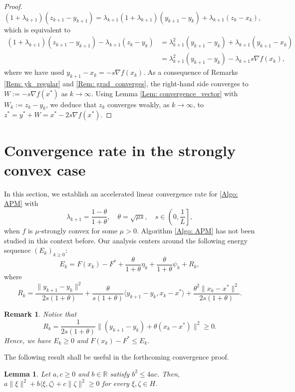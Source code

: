 \documentclass[pdflatex,sn-mathphys-num]{sn-jnl}
\theoremstyle{thmstyleone}
\newtheorem{lemma}[theorem]{Lemma}
\theoremstyle{thmstyletwo}
\newtheorem{remark}{Remark}
\theoremstyle{thmstylethree}
\begin{document}
\begin{proof}
$$ (1+\lambda_{k+1})(z_{k+1}-y_{k+1}) = \lambda_{k+1}(1+\lambda_{k+1})(y_{k+1}-y_k) + \lambda_{k+1}(z_k-x_k),  $$
which is equivalent to
\begin{align*}
(1+\lambda_{k+1})(z_{k+1}-y_{k+1})-\lambda_{k+1}(z_k-y_k) 
& = \lambda_{k+1}^2(y_{k+1}-y_k)+\lambda_{k+1}(y_{k+1}-x_k) \\
& = \lambda_{k+1}^2(y_{k+1}-y_k)-\lambda_{k+1}s\nabla f(x_k),
\end{align*}
where we have used $y_{k+1}-x_k=-s\nabla f(x_k)$. As a consequence of Remarks \ref{Rem: yk_regular} and \ref{Rem: grad_converges}, the right-hand side converges to $W:=-s\nabla f(x^*)$ as $k\to\infty$. Using Lemma \ref{Lem: convergence_vector} with $W_k:=z_k-y_k$, we deduce that $z_k$ converges weakly, as $k\to\infty$, to $z^*=y^*+W=x^*-2s\nabla f(x^*)$.
\end{proof}




\section{Convergence rate in the strongly convex case}\label{Sec: strong convexity}
In this section, we establish an accelerated linear convergence rate for \eqref{Algo: APM} with
$$ \lambda_{k+1} = \frac{1-\theta}{1+\theta},\quad \theta=\sqrt{\mu s},\quad s\in\left( 0,\frac{1}{L} \right], $$
when $f$ is $\mu$-strongly convex for some $\mu>0$. Algorithm \eqref{Algo: APM} has not been studied in this context before. Our analysis centers around the following energy sequence $(E_k)_{k\ge 0}$:
\begin{equation}\label{E: E_k_SC}
E_k = F(x_k) - F^* + \frac{\theta}{1+\theta}\eta_k + \frac{\theta}{1+\theta}\psi_k + R_k,
\end{equation}
where
$$ R_k = \frac{\| y_{k+1} - y_k \|^2}{2s(1+\theta)} + \frac{\theta}{s(1+\theta)}\langle y_{k+1}-y_k, x_k-x^* \rangle + \frac{\theta^2 \| x_k - x^* \|^2 }{2s(1+\theta)}. $$


\begin{remark}
Notice that
$$R_k = \frac{1}{2s(1+\theta)}\| (y_{k+1}-y_k) + \theta(x_k-x^*) \|^2 \ge 0.$$
Hence, we have $E_k \ge 0$ and $F(x_k)-F^*\le E_k$.
\end{remark}


The following result shall be useful in the forthcoming convergence proof.

\begin{lemma}\label{Lem: quadratic_positive}
Let $a,c\ge 0$ and $b\in\mathbb{R}$ satisfy $b^2\le 4ac$. Then, $a\| \xi \|^2 + b\langle \xi,\zeta \rangle + c\| \zeta \|^2 \ge 0$ for every $\xi,\zeta\in H$.
\end{lemma}
\end{document}
